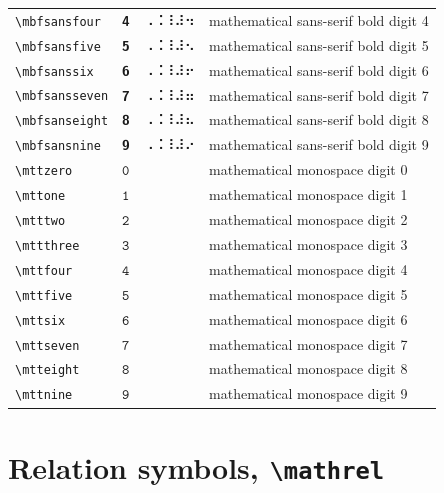 \documentclass[oneside]{article}
\begin{document}
\begin{longtable}{llll}
\verb|\mbfsansfour| & $\mbfsansfour$ &  ⠠⠨⠸⠼⠲  & {mathematical sans-serif bold digit 4} \\[2ex]
\verb|\mbfsansfive| & $\mbfsansfive$ &  ⠠⠨⠸⠼⠢  & {mathematical sans-serif bold digit 5} \\[2ex]
\verb|\mbfsanssix| & $\mbfsanssix$ &  ⠠⠨⠸⠼⠖  & {mathematical sans-serif bold digit 6} \\[2ex]
\verb|\mbfsansseven| & $\mbfsansseven$ &  ⠠⠨⠸⠼⠶  & {mathematical sans-serif bold digit 7} \\[2ex]
\verb|\mbfsanseight| & $\mbfsanseight$ &  ⠠⠨⠸⠼⠦  & {mathematical sans-serif bold digit 8} \\[2ex]
\verb|\mbfsansnine| & $\mbfsansnine$ &  ⠠⠨⠸⠼⠔  & {mathematical sans-serif bold digit 9} \\[2ex]
\verb|\mttzero| & $\mttzero$ &    & {mathematical monospace digit 0} \\[2ex]
\verb|\mttone| & $\mttone$ &    & {mathematical monospace digit 1} \\[2ex]
\verb|\mtttwo| & $\mtttwo$ &    & {mathematical monospace digit 2} \\[2ex]
\verb|\mttthree| & $\mttthree$ &    & {mathematical monospace digit 3} \\[2ex]
\verb|\mttfour| & $\mttfour$ &    & {mathematical monospace digit 4} \\[2ex]
\verb|\mttfive| & $\mttfive$ &    & {mathematical monospace digit 5} \\[2ex]
\verb|\mttsix| & $\mttsix$ &    & {mathematical monospace digit 6} \\[2ex]
\verb|\mttseven| & $\mttseven$ &    & {mathematical monospace digit 7} \\[2ex]
\verb|\mtteight| & $\mtteight$ &    & {mathematical monospace digit 8} \\[2ex]
\verb|\mttnine| & $\mttnine$ &    & {mathematical monospace digit 9} \\[2ex]
\end{longtable}


\clearpage

\section{Relation symbols, \texttt{\textbackslash{}mathrel}}
\end{document}
